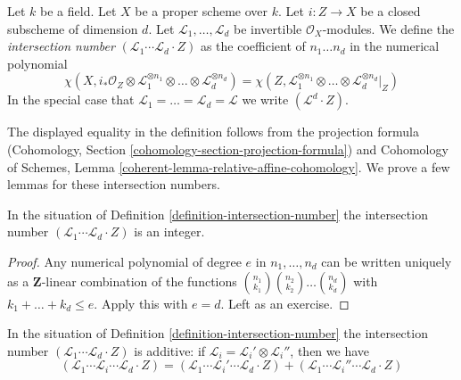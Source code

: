 
\begin{definition}
\label{definition-intersection-number}
Let $k$ be a field. Let $X$ be a proper scheme over $k$. Let
$i : Z \to X$ be a closed subscheme of dimension $d$. Let
$\mathcal{L}_1, \ldots, \mathcal{L}_d$ be invertible
$\mathcal{O}_X$-modules. We define the {\it intersection number}
$(\mathcal{L}_1 \cdots \mathcal{L}_d \cdot Z)$
as the coefficient of $n_1 \ldots n_d$ in the numerical polynomial
$$
\chi(X, i_*\mathcal{O}_Z \otimes \mathcal{L}_1^{\otimes n_1} \otimes
\ldots \otimes \mathcal{L}_d^{\otimes n_d}) =
\chi(Z, \mathcal{L}_1^{\otimes n_1} \otimes
\ldots \otimes \mathcal{L}_d^{\otimes n_d}|_Z)
$$
In the special
case that $\mathcal{L}_1 = \ldots = \mathcal{L}_d = \mathcal{L}$
we write $(\mathcal{L}^d \cdot Z)$.
\end{definition}

\noindent
The displayed equality in the definition follows from
the projection formula
(Cohomology, Section \ref{cohomology-section-projection-formula}) and
Cohomology of Schemes, Lemma
\ref{coherent-lemma-relative-affine-cohomology}.
We prove a few lemmas for these intersection numbers.

\begin{lemma}
\label{lemma-intersection-number-integer}
In the situation of Definition \ref{definition-intersection-number}
the intersection number
$(\mathcal{L}_1 \cdots \mathcal{L}_d \cdot Z)$
is an integer.
\end{lemma}

\begin{proof}
Any numerical polynomial of degree $e$ in $n_1, \ldots, n_d$ can be
written uniquely as a $\mathbf{Z}$-linear combination of the functions
${n_1 \choose k_1}{n_2 \choose k_2} \ldots {n_d \choose k_d}$ with
$k_1 + \ldots + k_d \leq e$. Apply this with $e = d$.
Left as an exercise.
\end{proof}

\begin{lemma}
\label{lemma-intersection-number-additive}
In the situation of Definition \ref{definition-intersection-number}
the intersection number
$(\mathcal{L}_1 \cdots \mathcal{L}_d \cdot Z)$
is additive: if $\mathcal{L}_i = \mathcal{L}_i' \otimes \mathcal{L}_i''$,
then we have
$$
(\mathcal{L}_1 \cdots \mathcal{L}_i \cdots \mathcal{L}_d \cdot Z) =
(\mathcal{L}_1 \cdots \mathcal{L}_i' \cdots \mathcal{L}_d \cdot Z) +
(\mathcal{L}_1 \cdots \mathcal{L}_i'' \cdots \mathcal{L}_d \cdot Z)
$$
\end{lemma}

